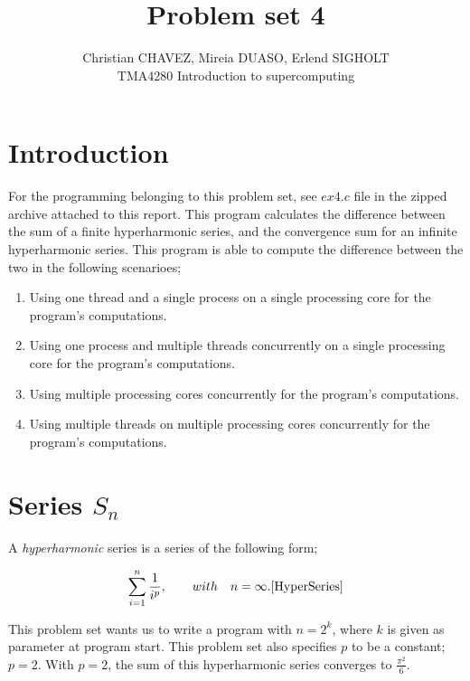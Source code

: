 \documentclass[fontsize=11pt,paper=a4,titlepage]{report}
\title{Problem set 4}
\author{Christian CHAVEZ, Mireia DUASO, Erlend SIGHOLT\\
TMA4280 Introduction to supercomputing}
\begin{document}
\maketitle


\section{Introduction}
For the programming belonging to this problem set, see $\textit{ex4.c}$ file in
the zipped archive attached to this report. This program calculates the
difference between the sum of a finite hyperharmonic series, and the convergence
sum for an infinite hyperharmonic series. This program is able to compute the
difference between the two in the following scenarioes;

\begin{enumerate}
	\item{Using one thread and a single process on a single processing core
for the program's computations.}
	\item{Using one process and multiple threads concurrently on a single
processing core for the program's computations.}
	\item{Using multiple processing cores concurrently for the program's
computations.}
	\item{Using multiple threads on multiple processing cores concurrently for
the program's computations.}
	\label{RunMode}
\end{enumerate}

\section{Series $S_n$}

A \textit{hyperharmonic} series is a series of the following form;

\begin{displaymath}
	\sum_{i=1}^{n} \frac{1}{i^p}, \quad \quad with \quad n = \infty.
	\ref{HyperSeries}
\end{displaymath}

This problem set wants us to write a program with $n = 2^k$, where $k$ is given
as parameter at program start. This
problem set also specifies $p$ to be a constant; $p = 2$. With $p = 2$, the sum
of this hyperharmonic series converges to $\frac{\pi^2}{6}$.
\end{document}

